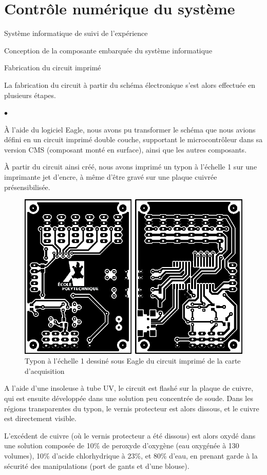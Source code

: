 \documentclass[a4paper,twoside,12pt]{article}
\newcounter{partie}
\newcounter{sous-partie}
\newenvironment{partie}[1]
{
\section{#1}
}
{

}
\newenvironment{sous-partie}[1]
{
\subsection{#1}
}
{

}
\newenvironment{sous-sous-partie}[1]
{
\subsubsection{#1}
}
{

}
\newenvironment{liste}
{
\vspace{0.2cm}
\begin{list}{$\bullet$\hspace{0.3cm}}{\leftmargin=1.4cm}
}
{
\end{list}
\vspace{0.2cm}
}
\begin{document}
\begin{partie}{Contrôle numérique du système}
\begin{sous-partie}{Système informatique de suivi de l'expérience}
\begin{sous-sous-partie}{Conception de la composante embarquée du système informatique}
\FloatBarrier

\begin{paragraph}{Fabrication du circuit imprimé\vspace{0.3cm}\\}

La fabrication du circuit à partir du schéma électronique s'est alors effectuée en plusieurs étapes.
\begin{liste}
\item À l'aide du logiciel Eagle, nous avons pu transformer le schéma que nous avions défini en un circuit imprimé double couche, supportant le microcontrôleur dans sa version CMS (composant monté en surface), ainsi que les autres composants.
\item À partir du circuit ainsi créé, nous avons imprimé un typon à l'échelle 1 sur une imprimante jet d'encre, à même d'être gravé sur une plaque cuivrée présensibilisée.
\begin{figure}[!h]
	\centering
	\includegraphics[scale=1]{./images/circuit_imprime_carte.eps}
	\caption{Typon à l'échelle 1 dessiné sous Eagle du circuit imprimé de la carte d'acquisition}
	\label{circuit_imprime_carte}
\end{figure}
\item A l'aide d'une insoleuse à tube UV, le circuit est flashé sur la plaque de cuivre, qui est ensuite développée dans une solution peu concentrée de soude. Dans les régions transparentes du typon, le vernis protecteur est alors dissous, et le cuivre est directement visible.
\item L'excédent de cuivre (où le vernis protecteur a été dissous) est alors oxydé dans une solution composée de 10\% de peroxyde d'oxygène (eau oxygénée à 130 volumes), 10\% d'acide chlorhydrique à 23\%, et 80\% d'eau, en prenant garde à la sécurité des manipulations (port de gants et d'une blouse).


\end{liste}
\end{paragraph}
\end{sous-sous-partie}
\end{sous-partie}
\end{partie}
\end{document}
